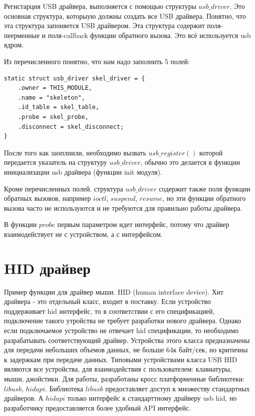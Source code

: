  
 

Регистарция USB драйвера, выполняется с помощью структуры $usb\_driver$. Это основная структура, которыую должны создать все USB драйвера. Понятно, что эта структура запоняется USB драйвером. Эта структура содержит поля-пеерменные и поля-callback функции обратного вызова. Это всё используется usb ядром. 

 

Из перечисленного понятно, что нам надо заполнить 5 полей:
\begin{lstlisting}
static struct usb_driver skel_driver = {
	.owner = THIS_MODULE,
	.name = "skeleton",
	.id_table = skel_table,
	.probe = skel_probe,
	.disconnect = skel_disconnect;
}
\end{lstlisting}


После того как заоплнили, необходимо вызвать  $usb\_register()$  которой передается указатель на структуру $usb\_driver$, обычно это делается в функции инициализации usb драйвера (функции init модуля).

 

Кроме перечисленных полей. структура $usb\_driver$ содержит также поля функции обратных вызовов, например $ioctl$, $suspend$, $resume$, но эти функции обратного вызова часто не используются и не требуются для правильно работы драйвера.

В функции $probe$ первым параметром идет интерфейс, потому что драйвер взаимодействует не с устройством, а с интерфейсом. 

\section{HID драйвер}

Пример функции для драйвер мыши. HID (human interface device). Хит драйвера -  это отдельный класс, входит в поставку. Если устройство поддерживает hid интерфейс, то  в соответствии с его спецификацией, подключение такого утройства не требует разработки нового  драйвера.  Однако если подключаемое устройство не отвечает hid спецификации, то необходимо разрабатывать соответствующий драйвер. Устройства этого класса предназначены для передачи небольших объемов данных, не больше 64к байт/сек, но критичны к задержкам при передаче данных. Типовыми устройствами класса USB HID являются все устройства, для взаимодействия с пользователем: клавиатуры, мыши, джойстики. Для работы, разработаны кросс платформенные библиотеки: $libusb$, $hidapi$. Библиотека $libusb$ предоставляет доступ к множеству стандартных драйверов. А $hidapi$ только интерфейс к стандарттному драйверу usb hid, но разработчику предоставляется более удобный API интерфейс.

